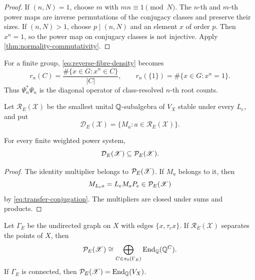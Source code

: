 \begin{proof}
If \((n,N)=1\), choose \(m\) with \(mn\equiv1\pmod N\).  The \(n\)-th and
\(m\)-th power maps are inverse permutations of the conjugacy classes and
preserve their sizes.  If \((n,N)>1\), choose
\(p\mid(n,N)\) and an element \(x\) of order \(p\).  Then \(x^n=1\), so
the power map on conjugacy classes is not injective.  Apply
\cref{thm:normality-commutativity}.
\end{proof}

For a finite group, \eqref{eq:reverse-fibre-density} becomes
\begin{equation}
 r_n(C)=
 \frac{\#\{x\in G:x^n\in C\}}{|C|},
 \qquad
 r_n(\{1\})=\#\{x\in G:x^n=1\}.
 \label{eq:group-ramification-density}
\end{equation}
Thus \(\Psi_n^*\Psi_n\) is the diagonal operator of class-resolved
\(n\)-th root counts.

\begin{definition}
\label{def:ramification-algebra}
Let \(\mathcal R_E(\mathscr X)\) be the smallest unital
\(\mathbb Q\)-subalgebra of \(V_X\) stable under every \(L_e\), and put
\[
 \mathcal D_E(\mathscr X)
 =\{M_a:a\in\mathcal R_E(\mathscr X)\}.
\]
\end{definition}

\begin{proposition}
\label{prop:ramification-diagonal-inclusion}
For every finite weighted power system,
\[
 \mathcal D_E(\mathscr X)\subseteq\mathcal P_E(\mathscr X).
\]
\end{proposition}

\begin{proof}
The identity multiplier belongs to \(\mathcal P_E(\mathscr X)\).  If \(M_a\)
belongs to it, then
\[
 M_{L_ea}=L_eM_aP_e\in\mathcal P_E(\mathscr X)
\]
by \eqref{eq:transfer-conjugation}.  The multipliers are closed under sums
and products.
\end{proof}

\begin{theorem}
\label{thm:diagonal-separation}
Let \(\Gamma_E\) be the undirected graph on \(X\) with edges
\(\{x,\tau_ex\}\).  If \(\mathcal R_E(\mathscr X)\) separates the points
of \(X\), then
\begin{equation}
 \mathcal P_E(\mathscr X)
 \cong\bigoplus_{C\in\pi_0(\Gamma_E)}
       \operatorname{End}_\mathbb Q(\mathbb Q^C).
 \label{eq:component-matrix-decomposition}
\end{equation}
If \(\Gamma_E\) is connected, then
\(\mathcal P_E(\mathscr X)=\operatorname{End}_\mathbb Q(V_X)\).
\end{theorem}

